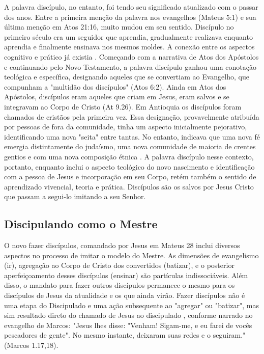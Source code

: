 \documentclass[12pt,openright,oneside,a4paper]{abntex2}
\begin{document}
A palavra discípulo, no entanto, foi tendo seu significado atualizado com o passar dos anos. Entre a primeira menção da palavra nos evangelhos (Mateus 5:1) e sua última menção em Atos 21:16, muito mudou em seu sentido. Discípulo no primeiro século era um seguidor que aprendia, gradualmente realizava enquanto aprendia e finalmente ensinava nos mesmos moldes. A conexão entre os aspectos cognitivo e prático já existia \cite[p. 105]{wilkins}. Começando com a narrativa de Atos dos Apóstolos e continuando pelo Novo Testamento, a palavra discípulo ganhou uma conotação teológica e específica, designando aqueles que se convertiam ao Evangelho, que compunham a "multidão dos discípulos" (Atos 6:2). Ainda em Atos dos Apóstolos, discípulos eram aqueles que criam em Jesus, eram salvos e se integravam ao Corpo de Cristo (At 9.26)\cite[p. 59-60]{brandao}. Em Antioquia os discípulos foram chamados de cristãos pela primeira vez. Essa designação, provavelmente atribuída por pessoas de fora da comunidade, tinha um aspecto inicialmente pejorativo, identificando uma nova "seita" entre tantas. No entanto, indicava que uma nova fé emergia distintamente do judaísmo, uma nova comunidade de maioria de crentes gentios e com uma nova composição étnica \cite[p. 90]{wan_diaspora_2011}. A palavra discípulo nesse contexto, portanto, enquanto inclui o aspecto teológico do novo nascimento e identificação com a pessoa de Jesus e incorporação em seu Corpo, retém também o sentido de aprendizado vivencial, teoria e prática. Discípulos são os salvos por Jesus Cristo que passam a segui-lo imitando a seu Senhor.

\subsection{Discipulando como o Mestre}


O novo fazer discípulos, comandado por Jesus em Mateus 28 inclui diversos aspectos no processo de imitar o modelo do Mestre. As dimensões de evangelismo (ir), agregação ao Corpo de Cristo dos convertidos (batizar), e o posterior aperfeiçoamento desses discípulos (ensinar) são partículas indissociáveis. Além disso, o mandato para fazer outros discípulos permanece o mesmo para os discípulos de Jesus da atualidade e os que ainda virão. Fazer discípulos não é uma etapa do Discipulado e uma ação subsequente ao "agregar" ou "batizar", mas sim resultado direto do chamado de Jesus ao discipulado \cite[p. 64]{brandao}, conforme narrado no evangelho de Marcos: "Jesus lhes disse: "Venham! Sigam-me, e eu farei de vocês pescadores de gente". No mesmo instante, deixaram suas redes e o seguiram."(Marcos 1.17,18).
\end{document}
